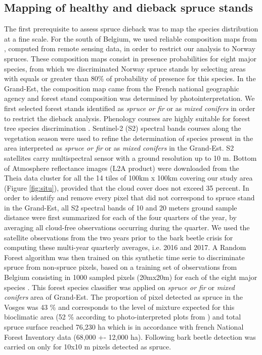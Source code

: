 \documentclass[3p,procedia]{elsarticle}
\def\surfEPVosges{76,230 }
\begin{document}
\subsection{Mapping of healthy and dieback spruce stands}
The first prerequisite to assess spruce dieback was to map the species distribution at a fine scale.
For the south of Belgium, we used reliable composition maps from \cite{bolyn_mapping_2022}, computed from remote sensing data, in order to restrict our analysis to Norway spruces. 
These composition maps consist in presence probabilities for eight major species, from which we discriminated Norway spruce stands by selecting areas with equals or greater than 80\% of probability of presence for this species.  
In the Grand-Est, the composition map came from the French national geographic agency \citep{IGN_bd_2018} and forest stand composition was determined by photointerpretation.
We first selected forest stands identified as \textit{spruce or fir} or as \textit{mixed conifers} in order to restrict the dieback analysis. 
Phenology courses are highly suitable for forest tree species discrimination \citep{lisein_discrimination_2015,grabska_forest_2019,ma_tree_2021}.
Sentinel-2 (S2) spectral bands courses along the vegetation season were used to refine the determination of species present in the area interpreted as \textit{spruce or fir} or as \textit{mixed conifers} in the Grand-Est. 
S2 satellites carry multispectral sensor with a ground resolution up to 10 m. 
Bottom of Atmosphere reflectance images (L2A product) were downloaded from the Theia data cluster \citep{theia_team} for all the 14 tiles of 100km x 100km covering our study area (Figure \ref{fig:situ}), provided that the cloud cover does not exceed 35 percent.
In order to identify and remove every pixel that did not correspond to spruce stand in the Grand-Est, all S2 spectral bands of 10 and 20 meters ground sample distance were first summarized for each of the four quarters of the year, by averaging all cloud-free observations occurring during the quarter.
We used the satellite observations from the two years prior to the bark beetle crisis for computing these multi-year quarterly averages, i.e. 2016 and 2017.
A Random Forest algorithm was then trained on this synthetic time serie to discriminate spruce from non-spruce pixels, based on a training set of observations from Belgium consisting in 1000 sampled pixels (20mx20m) for each of the eight major species \citep{bolyn_forest_2018}.
This forest species classifier was applied on \textit{spruce or fir} or \textit{mixed conifers} area of Grand-Est. 
The proportion of pixel detected as spruce in the Vosges was 43 \% and corresponds to the level of mixture expected for this bioclimatic area (52 \% according to photo-interpreted plots from \cite{piedallu_spatial_2022}) and total spruce surface reached \surfEPVosges ha which is in accordance with french National Forest Inventory data (68,000 +- 12,000 ha).
Following bark beetle detection was carried on only for 10x10 m pixels detected as spruce.
\end{document}
